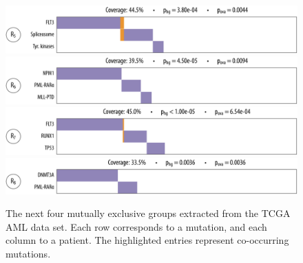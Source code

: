 \begin{figure}[htbp]
\centering
\includegraphics[width=\textwidth]{figures/genes/aml_5.pdf}\\[2em]
\includegraphics[width=\textwidth]{figures/genes/aml_6.pdf}\\[2em]
\includegraphics[width=\textwidth]{figures/genes/aml_7.pdf}\\[2em]
\includegraphics[width=\textwidth]{figures/genes/aml_8.pdf}\\[2em]
\caption{The next four mutually exclusive groups extracted from the TCGA AML data set.
Each row corresponds to a mutation, and each column to a patient.
The highlighted entries represent co-occurring mutations.}
\end{figure}

